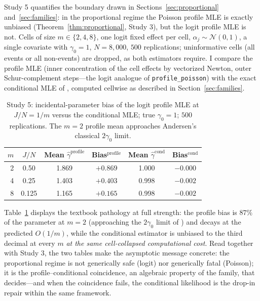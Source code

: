 \documentclass[11pt]{article}
\begin{document}
Study 5 quantifies the boundary drawn in
Sections~\ref{sec:proportional} and~\ref{sec:families}: in the
proportional regime the Poisson profile MLE is exactly unbiased
(Theorem~\ref{thm:proportional}, Study 3), but the logit profile MLE is
not.  Cells of size $m \in \{2, 4, 8\}$, one logit fixed effect per
cell, $\alpha_j \sim \mathcal{N}(0,1)$, a single covariate with
$\gamma_0 = 1$, $N = 8{,}000$, $500$ replications; uninformative cells
(all events or all non-events) are dropped, as both estimators require.
I compare the profile MLE (inner concentration of the cell effects by
vectorized Newton, outer Schur-complement steps---the logit analogue of
\texttt{profile\_poisson}) with the exact conditional MLE of
\citet{chamberlain1980}, computed cellwise as described in
Section~\ref{sec:families}.

\begin{table}[t]
\centering
\caption{Study 5: incidental-parameter bias of the logit profile MLE at
$J/N = 1/m$ versus the conditional MLE; true $\gamma_0 = 1$; $500$
replications.  The $m = 2$ profile mean approaches Andersen's classical
$2\gamma_0$ limit.}
\label{tab:sim5}
\small
\begin{tabular}{rccccc}
\toprule
$m$ & $J/N$ & Mean $\hat\gamma^{\mathrm{profile}}$ &
Bias$^{\mathrm{profile}}$ & Mean $\hat\gamma^{\mathrm{cond}}$ &
Bias$^{\mathrm{cond}}$ \\
\midrule
2 & 0.50  & 1.869 & $+0.869$ & 1.000 & $-0.000$ \\
4 & 0.25  & 1.403 & $+0.403$ & 0.998 & $-0.002$ \\
8 & 0.125 & 1.165 & $+0.165$ & 0.998 & $-0.002$ \\
\bottomrule
\end{tabular}
\end{table}

Table~\ref{tab:sim5} displays the textbook pathology at full strength:
the profile bias is $87\%$ of the parameter at $m = 2$ (approaching the
$2\gamma_0$ limit of \citealp{andersen1970}) and decays at the
predicted $O(1/m)$, while the conditional estimator is unbiased to the
third decimal at every $m$ \emph{at the same cell-collapsed
computational cost}.  Read together with Study 3, the two tables make
the asymptotic message concrete: the proportional regime is not
generically safe (logit) nor generically fatal (Poisson); it is the
profile--conditional coincidence, an algebraic property of the family,
that decides---and when the coincidence fails, the conditional
likelihood is the drop-in repair within the same framework.
\end{document}

